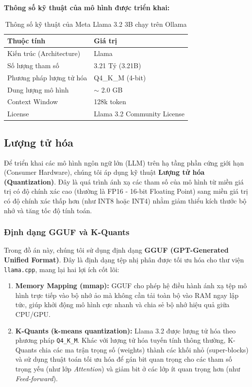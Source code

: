 \textbf{Thông số kỹ thuật của mô hình được triển khai:}
\begin{table}[H]
\centering
\begin{tabular}{|l|l|}
\hline
\textbf{Thuộc tính} & \textbf{Giá trị} \\ \hline
Kiến trúc (Architecture) & Llama \\ \hline
Số lượng tham số & 3.21 Tỷ (3.21B) \\ \hline
Phương pháp lượng tử hóa & Q4\_K\_M (4-bit) \\ \hline
Dung lượng mô hình & $\sim$ 2.0 GB \\ \hline
Context Window & 128k token \\ \hline
License & Llama 3.2 Community License \\ \hline
\end{tabular}
\caption{Thông số kỹ thuật của Meta Llama 3.2 3B chạy trên Ollama}
\end{table}
\subsection{Lượng tử hóa}
Để triển khai các mô hình ngôn ngữ lớn (LLM) trên hạ tầng phần cứng giới hạn (Consumer Hardware), chúng tôi áp dụng kỹ thuật \textbf{Lượng tử hóa (Quantization)}. Đây là quá trình ánh xạ các tham số của mô hình từ miền giá trị có độ chính xác cao (thường là FP16 - 16-bit Floating Point) sang miền giá trị có độ chính xác thấp hơn (như INT8 hoặc INT4) nhằm giảm thiểu kích thước bộ nhớ và tăng tốc độ tính toán.

\subsubsection{Định dạng GGUF và K-Quants}

Trong đồ án này, chúng tôi sử dụng định dạng \textbf{GGUF (GPT-Generated Unified Format)}. Đây là định dạng tệp nhị phân được tối ưu hóa cho thư viện \texttt{llama.cpp}, mang lại hai lợi ích cốt lõi:

\begin{enumerate}
    \item \textbf{Memory Mapping (mmap):} GGUF cho phép hệ điều hành ánh xạ tệp mô hình trực tiếp vào bộ nhớ ảo mà không cần tải toàn bộ vào RAM ngay lập tức, giúp khởi động mô hình cực nhanh và chia sẻ bộ nhớ hiệu quả giữa CPU/GPU.
    \item \textbf{K-Quants (k-means quantization):} Llama 3.2 được lượng tử hóa theo phương pháp \texttt{Q4\_K\_M}. Khác với lượng tử hóa tuyến tính thông thường, K-Quants chia các ma trận trọng số (weights) thành các khối nhỏ (super-blocks) và sử dụng thuật toán tối ưu hóa để gán bit quan trọng cho các tham số trọng yếu (như lớp \textit{Attention}) và giảm bit ở các lớp ít quan trọng hơn (như \textit{Feed-forward}).
\end{enumerate}

